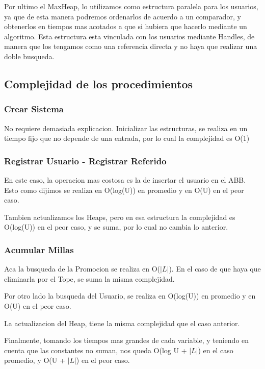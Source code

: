 \documentclass[11pt,a4paper]{article}
\begin{document}
Por ultimo el MaxHeap, lo utilizamos como estructura paralela para los usuarios, ya que de esta manera podremos ordenarlos de acuerdo a un comparador, y obtenerlos en tiempos mas acotados a que si hubiera que hacerlo mediante un algoritmo. Esta estructura esta vinculada con los usuarios mediante Handles, de manera que los tengamos como una referencia directa y no haya que realizar una doble busqueda.

\subsection{Complejidad de los procedimientos}

\subsubsection{Crear Sistema}

No requiere demasiada explicacion. Inicializar las estructuras, se realiza en un tiempo fijo que no depende de una entrada, por lo cual la complejidad es O(1)

\subsubsection{Registrar Usuario - Registrar Referido}
En este caso, la operacion mas costosa es la de insertar el usuario en el ABB. Esto como dijimos se realiza en O(log(U)) en promedio y en O(U) en el peor caso.

Tambien actualizamos los Heaps, pero en esa estructura la complejidad es O(log(U)) en el peor caso, y se suma, por lo cual no cambia lo anterior.

\subsubsection{Acumular Millas}

Aca la busqueda de la Promocion se realiza en O($|L|$). En el caso de que haya que eliminarla por el Tope, se suma la misma complejidad.

Por otro lado la busqueda del Usuario, se realiza en O(log(U)) en promedio y en O(U) en el peor caso.

La actualizacion del Heap, tiene la misma complejidad que el caso anterior.

Finalmente, tomando los tiempos mas grandes de cada variable, y teniendo en cuenta que las constantes no suman, nos queda O(log U + $|L|$) en el caso promedio, y O(U + $|L|$) en el peor caso.
\end{document}
